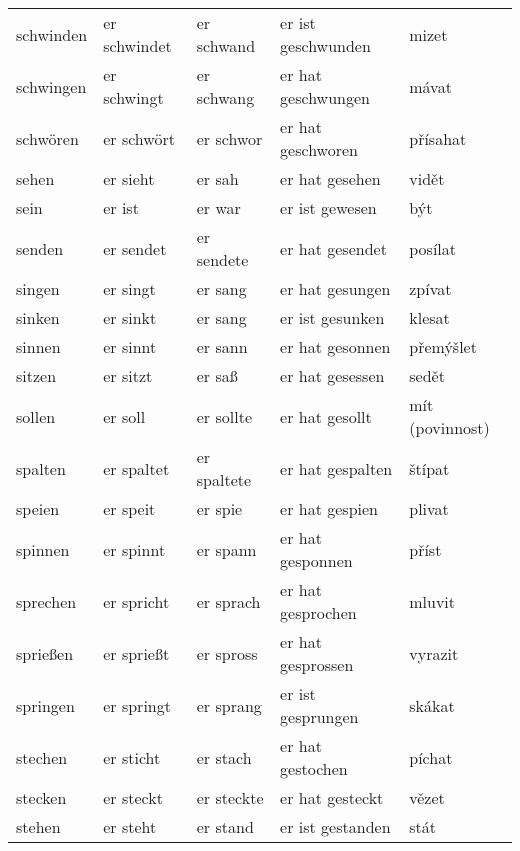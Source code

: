 \documentclass[a4paper,12pt]{report}
\begin{document}
\begin{longtable}{ | m{2cm} | m{2.5cm} | m{2.5cm} | m{4cm} | m{3cm} | }
    schwinden   & er schwindet  & er schwand   & er ist geschwunden & mizet              \\
    schwingen   & er schwingt   & er schwang   & er hat geschwungen & mávat              \\
    schwören    & er schwört    & er schwor    & er hat geschworen  & přísahat           \\
    sehen       & er sieht      & er sah       & er hat gesehen     & vidět              \\
    sein        & er ist        & er war       & er ist gewesen     & být                \\
    senden      & er sendet     & er sendete   & er hat gesendet    & posílat            \\
    singen      & er singt      & er sang      & er hat gesungen    & zpívat             \\
    sinken      & er sinkt      & er sang      & er ist gesunken    & klesat             \\
    sinnen      & er sinnt      & er sann      & er hat gesonnen    & přemýšlet          \\
    sitzen      & er sitzt      & er saß       & er hat gesessen    & sedět              \\
    \hline
    \hline
    sollen      & er soll       & er sollte    & er hat gesollt     & mít (povinnost)    \\
    spalten     & er spaltet    & er spaltete  & er hat gespalten   & štípat             \\
    speien      & er speit      & er spie      & er hat gespien     & plivat             \\
    spinnen     & er spinnt     & er spann     & er hat gesponnen   & příst              \\
    sprechen    & er spricht    & er sprach    & er hat gesprochen  & mluvit             \\
    sprießen    & er sprießt    & er spross    & er hat gesprossen  & vyrazit            \\
    springen    & er springt    & er sprang    & er ist gesprungen  & skákat             \\
    stechen     & er sticht     & er stach     & er hat gestochen   & píchat             \\
    stecken     & er steckt     & er steckte   & er hat gesteckt    & vězet              \\
    stehen      & er steht      & er stand     & er ist gestanden   & stát               \\

\end{longtable}
\end{document}
